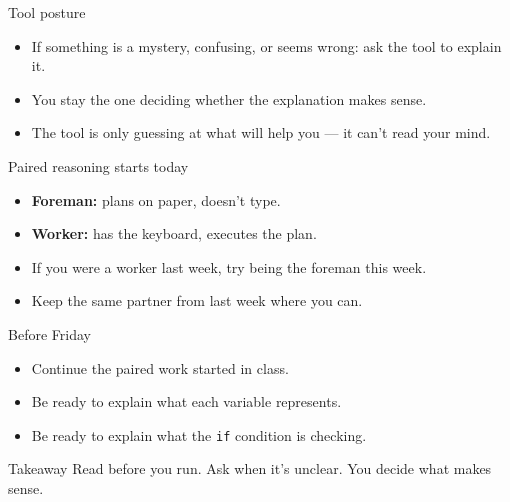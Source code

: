 \documentclass{beamer}
\begin{document}
\begin{frame}{Tool posture}
  \begin{itemize}
    \item If something is a mystery, confusing, or seems wrong: ask the tool to explain it.
    \item You stay the one deciding whether the explanation makes sense.
    \item The tool is only guessing at what will help you --- it can't read your mind.
  \end{itemize}
\end{frame}

\begin{frame}{Paired reasoning starts today}
  \begin{itemize}
    \item \textbf{Foreman:} plans on paper, doesn't type.
    \item \textbf{Worker:} has the keyboard, executes the plan.
    \item If you were a worker last week, try being the foreman this week.
    \item Keep the same partner from last week where you can.
  \end{itemize}
\end{frame}

\begin{frame}{Before Friday}
  \begin{itemize}
    \item Continue the paired work started in class.
    \item Be ready to explain what each variable represents.
    \item Be ready to explain what the \texttt{if} condition is checking.
  \end{itemize}
\end{frame}

\begin{frame}{Takeaway}
  \Huge
  \centering
  Read before you run. Ask when it's unclear. You decide what makes sense.
\end{frame}
\end{document}
